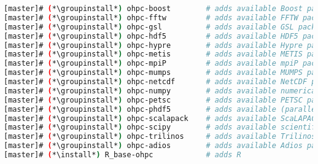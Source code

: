 \begin{lstlisting}[language=bash,keywords={},upquote=true,keepspaces]
[master]# (*\groupinstall*) ohpc-boost        # adds available Boost packages
[master]# (*\groupinstall*) ohpc-fftw         # adds available FFTW packages
[master]# (*\groupinstall*) ohpc-gsl          # adds available GSL packages
[master]# (*\groupinstall*) ohpc-hdf5         # adds available HDF5 packages
[master]# (*\groupinstall*) ohpc-hypre        # adds available Hypre packages
[master]# (*\groupinstall*) ohpc-metis        # adds available METIS packages
[master]# (*\groupinstall*) ohpc-mpiP         # adds available mpiP packages
[master]# (*\groupinstall*) ohpc-mumps        # adds available MUMPS packages
[master]# (*\groupinstall*) ohpc-netcdf       # adds available NetCDF packages
[master]# (*\groupinstall*) ohpc-numpy        # adds available numerical Python packages
[master]# (*\groupinstall*) ohpc-petsc        # adds available PETSC packages
[master]# (*\groupinstall*) ohpc-phdf5        # adds available (parallel) HDF5 packages
[master]# (*\groupinstall*) ohpc-scalapack    # adds available ScaLAPACK packages
[master]# (*\groupinstall*) ohpc-scipy        # adds available scientific Python packages
[master]# (*\groupinstall*) ohpc-trilinos     # adds available Trilinos packages
[master]# (*\groupinstall*) ohpc-adios        # adds available Adios packages
[master]# (*\install*) R_base-ohpc            # adds R
\end{lstlisting}
